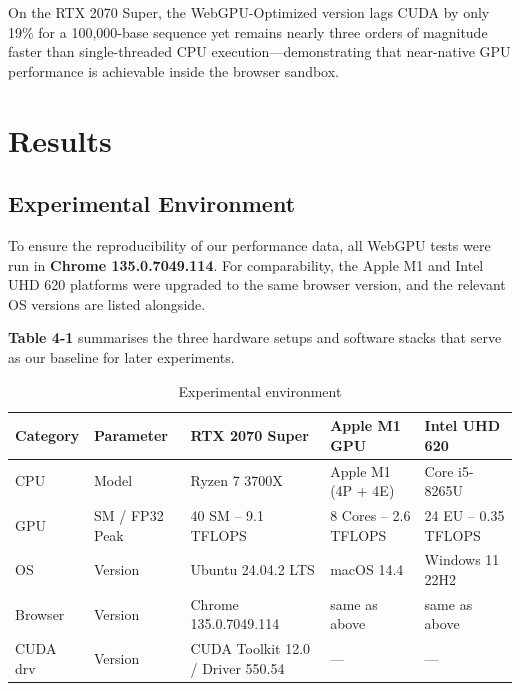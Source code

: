 \documentclass[PhD]{PHlab-thesis}
\begin{document}
On the RTX 2070 Super, the WebGPU-Optimized version lags CUDA by only 19\% for a 100,000-base sequence yet remains nearly three orders of magnitude faster than single-threaded CPU execution—demonstrating that near-native GPU performance is achievable inside the browser sandbox.

	
\chapter{Results}
\section{Experimental Environment}
To ensure the reproducibility of our performance data, all WebGPU tests were run in \textbf{Chrome 135.0.7049.114}.
For comparability, the Apple M1 and Intel UHD 620 platforms were upgraded to the same browser version, and the relevant OS versions are listed alongside.

\textbf{Table 4-1} summarises the three hardware setups and software stacks that serve as our baseline for later experiments.

\begin{table}[htbp]
  \centering
  \caption{Experimental environment}
  \label{tab:exp_env}

  \setlength{\tabcolsep}{8pt}         %
  \renewcommand{\arraystretch}{1.4}   %

  \begin{tabularx}{\textwidth}{@{}lX X X X@{}}
    \toprule
    Category & Parameter & RTX 2070 Super & Apple M1 GPU & Intel UHD 620 \\
    \midrule
    CPU      & Model                 & Ryzen 7 3700X        & Apple M1 (4P + 4E) & Core i5-8265U \\
    GPU      & SM / FP32 Peak        & 40 SM – 9.1 TFLOPS   & 8 Cores – 2.6 TFLOPS & 24 EU – 0.35 TFLOPS \\
    OS       & Version               & Ubuntu 24.04.2 LTS   & macOS 14.4           & Windows 11 22H2 \\
    Browser  & Version               & Chrome 135.0.7049.114 & same as above                & same as above \\
    CUDA drv & Version               & CUDA Toolkit 12.0 / Driver 550.54 & — & — \\
    \bottomrule
  \end{tabularx}
\end{table}
\end{document}
